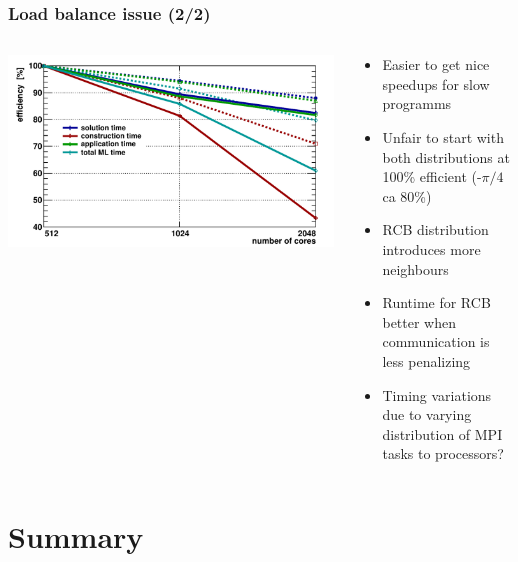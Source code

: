 \documentclass[xcolor=pdftex,table,10pt]{beamer}
\begin{document}
    \begin{frame}
        \frametitle{Load balance issue (2/2)}

		\begin{columns}
		\begin{column}{6.5cm}
            \centering
		    \includegraphics[width=0.99\textwidth]{plots/eff_new_1024.pdf}

        \end{column}
        \begin{column}{4.5cm}
            \begin{itemize} 
                \item Easier to get nice speedups for slow programms
                \item Unfair to start with both distributions at 100\% efficient (-$\pi/4$ ca 80\%)
                \item RCB distribution introduces more neighbours %
                \item Runtime for RCB better when communication is less penalizing
                \item Timing variations due to varying distribution of MPI tasks to processors?
            \end{itemize}
        \end{column}
        \end{columns}

    \end{frame}


    \section{Summary}
\end{document}
